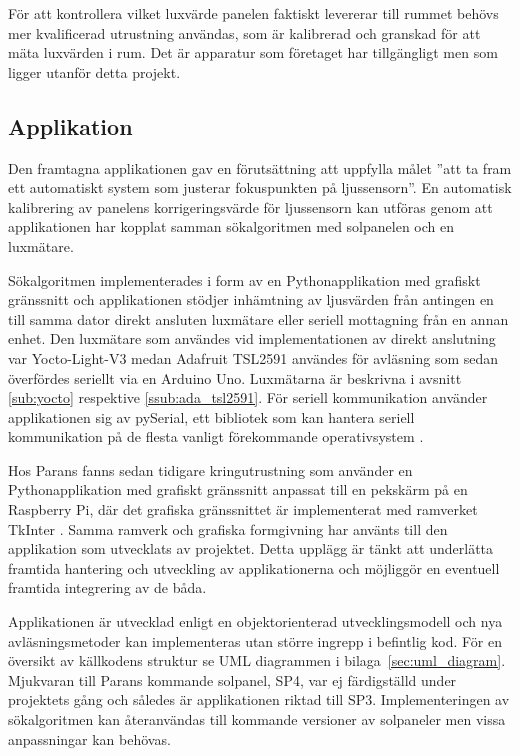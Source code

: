             För att kontrollera vilket luxvärde panelen faktiskt levererar till rummet behövs mer kvalificerad utrustning användas, som är kalibrerad och granskad för att mäta luxvärden i rum. Det är apparatur som företaget har tillgängligt men som ligger utanför detta projekt.

    \subsection{Applikation} %
    \label{sub:applikation}
        Den framtagna applikationen gav en förutsättning att uppfylla målet ''att ta fram ett automatiskt system som justerar fokuspunkten på ljussensorn''. En automatisk kalibrering av panelens korrigeringsvärde för ljussensorn kan utföras genom att applikationen har kopplat samman sökalgoritmen med solpanelen och en luxmätare.\bigskip

        Sökalgoritmen implementerades i form av en Pythonapplikation med grafiskt gränssnitt och applikationen stödjer inhämtning av ljusvärden från antingen en till samma dator direkt ansluten luxmätare eller seriell mottagning från en annan enhet. Den luxmätare som användes vid implementationen av direkt anslutning var Yocto-Light-V3 medan Adafruit TSL2591 användes för avläsning som sedan överfördes seriellt via en Arduino Uno. Luxmätarna är beskrivna i avsnitt \ref{sub:yocto} respektive \ref{ssub:ada_tsl2591}. För seriell kommunikation använder applikationen sig av pySerial, ett bibliotek som kan hantera seriell kommunikation på de flesta vanligt förekommande operativsystem \cite{pyserial}. \bigskip

        Hos Parans fanns sedan tidigare kringutrustning som använder en Pythonapplikation med grafiskt gränssnitt anpassat till en pekskärm på en Raspberry Pi, där det grafiska gränssnittet är implementerat med ramverket TkInter \cite{solarremote}. Samma ramverk och grafiska formgivning har använts till den applikation som utvecklats av projektet. Detta upplägg är tänkt att underlätta framtida hantering och utveckling av applikationerna och möjliggör en eventuell framtida integrering av de båda. \bigskip

        Applikationen är utvecklad enligt en objektorienterad utvecklingsmodell och nya avläsningsmetoder kan implementeras utan större ingrepp i befintlig kod. För en översikt av källkodens struktur se UML diagrammen i bilaga~\ref{sec:uml_diagram}. Mjukvaran till Parans kommande solpanel, SP4, var ej färdigställd under projektets gång och således är applikationen riktad till SP3. Implementeringen av sökalgoritmen kan återanvändas till kommande versioner av solpaneler men vissa anpassningar kan behövas.
